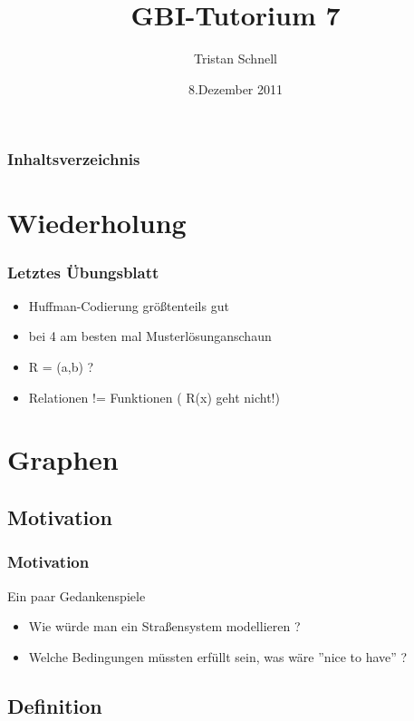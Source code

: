 \documentclass{beamer}
\author{Tristan Schnell}
\title{GBI-Tutorium 7}
\date{8.Dezember 2011}
\begin{document}
\begin {frame}
	\titlepage
\end {frame}

\begin {frame}
	\frametitle {Inhaltsverzeichnis}
	\tableofcontents
\end {frame}

\section{Wiederholung}

\begin{frame}
	\frametitle{Letztes \"Ubungsblatt}
		\begin{itemize}
			\item Huffman-Codierung größtenteils gut
			\item bei 4 am besten mal Musterlösunganschaun
			\item R = (a,b) ?
			\item Relationen != Funktionen ( R(x) geht nicht!)
		\end{itemize}
\end{frame}

\section{Graphen} 
\subsection{Motivation}

\begin{frame}
	\frametitle{Motivation}

	\begin{block}{Ein paar Gedankenspiele}

		\begin{itemize}
			\item Wie w\"urde man ein Stra{\ss}ensystem modellieren ?
			\item Welche Bedingungen m\"ussten erf\"ullt sein, was w\"are ''nice to have'' ?
		\end{itemize}


	\end{block}
\end{frame}

\subsection{Definition}
\end{document}
